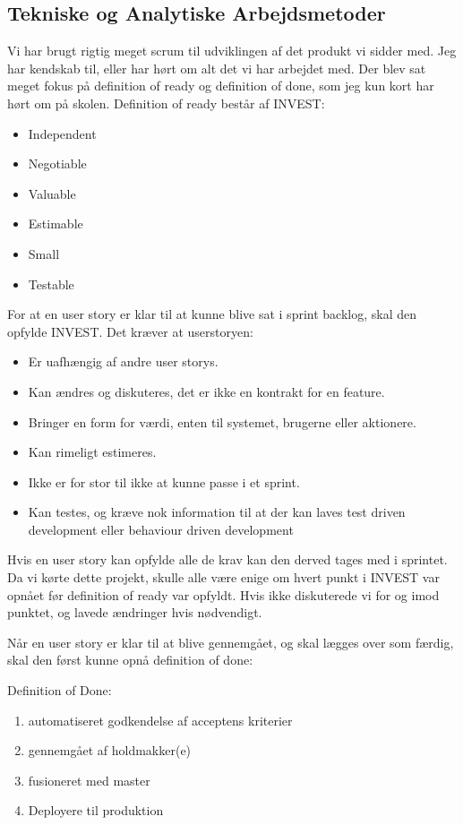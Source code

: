 \documentclass[11pt]{report}
\begin{document}
\subsection*{Tekniske og Analytiske Arbejdsmetoder}
Vi har brugt rigtig meget scrum til udviklingen af det produkt vi sidder med. 
Jeg har kendskab til, eller har hørt om alt det vi har arbejdet med. 
Der blev sat meget fokus på definition of ready og definition of done, som jeg kun kort har hørt om på skolen.
Definition of ready består af INVEST:

\begin{itemize}
  \item Independent
  \item Negotiable
  \item Valuable
  \item Estimable
  \item Small
  \item Testable
\end{itemize}

For at en user story er klar til at kunne blive sat i sprint backlog, skal den opfylde INVEST. 
Det kræver at userstoryen:

\begin{itemize}
  \item Er uafhængig af andre user storys.
  \item Kan ændres og diskuteres, det er ikke en kontrakt for en feature.
  \item Bringer en form for værdi, enten til systemet, brugerne eller aktionere. 
  \item Kan rimeligt estimeres.
  \item Ikke er for stor til ikke at kunne passe i et sprint.
  \item Kan testes, og kræve nok information til at der kan laves test driven development eller behaviour driven development
\end{itemize}

Hvis en user story kan opfylde alle de krav kan den derved tages med i sprintet. 
Da vi kørte dette projekt, skulle alle være enige om hvert punkt i INVEST var opnået før definition of ready var opfyldt. 
Hvis ikke diskuterede vi for og imod punktet, og lavede ændringer hvis nødvendigt. 

Når en user story er klar til at blive gennemgået, og skal lægges over som færdig, skal den først kunne opnå definition of done:

Definition of Done:

\begin{enumerate}
  \item automatiseret godkendelse af acceptens kriterier
  \item gennemgået af holdmakker(e)
  \item fusioneret med master
  \item Deployere til produktion
\end{enumerate} 
\end{document}
